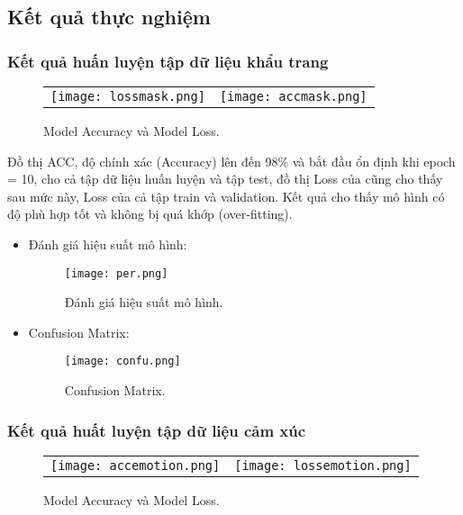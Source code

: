 \subsection{Kết quả thực nghiệm}

\subsubsection{Kết quả huấn luyện tập dữ liệu khẩu trang}

\begin{figure}[h!] 
	\begin{tabular}{cc}
		\centering
		\texttt{[image: lossmask.png]} &
		\texttt{[image: accmask.png]} 
	\end{tabular}
	\caption[Model Accuracy và Model Loss.]{Model Accuracy và Model Loss.}
	\label{fig:modelloss and Model Accuracy}
\end{figure}

Đồ thị ACC,  độ chính xác (Accuracy) lên đến 98\% và bắt đầu ổn định khi epoch = 10,  cho cả tập dữ liệu huấn luyện và tập test, đồ thị Loss của cũng cho thấy sau mức này, Loss của cả tập train và validation. Kết quả cho thấy mô hình có độ phù hợp tốt và không bị quá khớp (over-fitting).

\begin{itemize}
	\item Đánh giá hiệu suất mô hình:

	\begin{figure}[h!]
		\centering
		\texttt{[image: per.png]}
		\caption[Đánh giá hiệu suất mô hình.]{Đánh giá hiệu suất mô hình.}
		\label{fig:per} 
	\end{figure}

	\item Confusion Matrix:
		
	\begin{figure}[h!]
		\centering
		\texttt{[image: confu.png]}
		\caption[Confusion Matrix.]{Confusion Matrix.}
		\label{fig:confu} 
	\end{figure}
\end{itemize}

\subsubsection{Kết quả huất luyện tập dữ liệu cảm xúc}

\begin{figure}[h!] 
	\begin{tabular}{cc}
		\centering
		\texttt{[image: accemotion.png]} &
		\texttt{[image: lossemotion.png]} 
	\end{tabular}
	\caption[Model Accuracy và Model Loss.]{Model Accuracy và Model Loss.}
	\label{fig:modelloss_and_Model Accuracy}
\end{figure}

